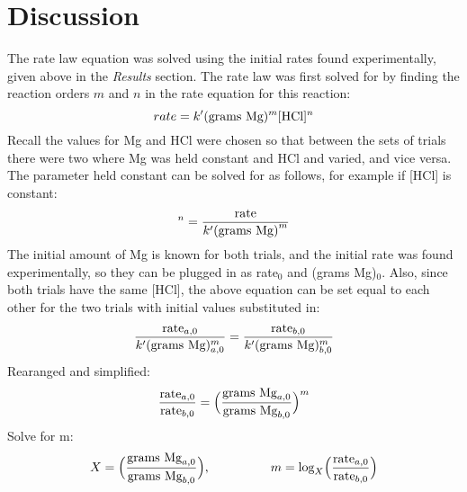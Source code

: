 \documentclass[12pt, letterpaper]{article}
\begin{document}
\section{Discussion}\doublespacing
The rate law equation was solved using the initial rates found experimentally, given above in the \textit{Results} section. The rate law was first solved for by finding the reaction orders $m$ and $n$ in the rate equation for this reaction:
\begin{equation}
rate = k'(\textnormal{grams Mg})^m [\textnormal{HCl}]^n
\label{eq:ratel}
\end{equation}
Recall the values for Mg and HCl were chosen so that between the sets of trials there were two where Mg was held constant and HCl and varied, and vice versa. The parameter held constant can be solved for as follows, for example if [HCl] is constant:
\begin{equation}
[\textnormal{HCl}]^n = \frac{\textnormal{rate}}{k'(\textnormal{grams Mg)}^m}
\end{equation}
The initial amount of Mg is known for both trials, and the initial rate was found experimentally, so they can be plugged in as rate$_0$ and (grams Mg)$_0$. Also, since both trials have the same [HCl], the above equation can be set equal to each other for the two trials with initial values substituted in:
\begin{equation}
\frac{\textnormal{rate}_{a,0}}{k' (\textnormal{grams Mg})_{a,0}^m} = \frac{\textnormal{rate}_{b,0}}{k' (\textnormal{grams Mg})_{b,0}^m} 
\end{equation}
Rearanged and simplified:
\begin{equation}
\frac{\textnormal{rate}_{a,0}}{\textnormal{rate}_{b,0}} = \Big(\frac{\textnormal{grams Mg}_{a,0}}{\textnormal{grams Mg}_{b,0}}\Big)^m
\end{equation}
Solve for m:
\begin{equation}
X = \Big(\frac{\textnormal{grams Mg}_{a,0}}{\textnormal{grams Mg}_{b,0}}\Big), \hspace{48pt} m = \textnormal{log}_X\Big(\frac{\textnormal{rate}_{a,0}}{\textnormal{rate}_{b,0}}\Big)
\end{equation}
\end{document}
